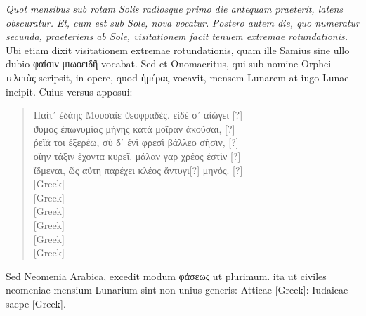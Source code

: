 \textit{Quot mensibus sub rotam Solis radiosque primo die
antequam praeterit, latens obscuratur.}
 \textit{Et, cum est sub Sole, nova vocatur.}
\textit{Postero autem die, quo numeratur secunda,
 praeteriens ab Sole, visitationem
facit tenuem extremae rotundationis.}
Ubi etiam dixit visitationem
extremae rotundationis, quam ille Samius sine ullo dubio
 \textgreek{φαίσιν μιωοειδῆ} vocabat.
Sed et Onomacritus, qui sub nomine Orphei
 \textgreek{τελετὰς}
scripsit, in opere, quod
 \textgreek{ἡμέρας}
 vocavit, mensem Lunarem at iugo Lunae
incipit.
Cuius versus apposui:
\begin{quote}
\begin{greek}
Παίτ᾽ ἐδάης Μουσαῖε ϑεοφραδἐς. εἰδέ σ᾽ αἰώγει [?]\\
ϑυμὸς ἐπωνυμίας μήνης κατὰ μοῖραν ἀκοῦσαι, [?]\\
ῤεῖά τοι ἐξερέω, σὺ δ᾽ ἐνὶ φρεσὶ βάλλεο σῆσιν, [?]\\
οἵην τάξιν ἔχοντα κυρεῖ. μάλαν γαρ χρέος ἐστὶν [?]\\
ἴδμεναι, ῶς αὕτη παρέχει κλέος ἄντυγι[?] μηνός. [?]\\
\textgreek{[Greek]}\\
\textgreek{[Greek]}\\
\textgreek{[Greek]}\\
\textgreek{[Greek]}\\
\textgreek{[Greek]}\\
\textgreek{[Greek]}
\end{greek}
\end{quote}
Sed Neomenia Arabica, excedit modum
 \textgreek{φάσεως} ut plurimum. ita ut
civiles neomeniae mensium Lunarium sint non unius generis: Atticae
\textgreek{[Greek]}: Iudaicae saepe \textgreek{[Greek]}.
